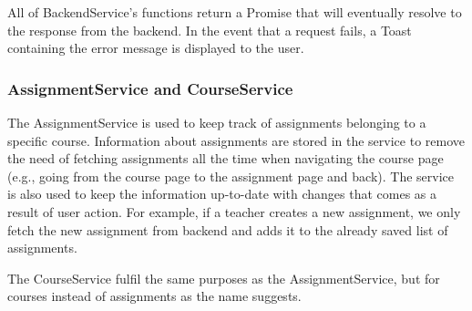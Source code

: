 All of BackendService's functions return a Promise that will eventually resolve to the response from the backend. In the event that a request fails, a Toast containing the error message is displayed to the user. 

\subsubsection{AssignmentService and CourseService}
The AssignmentService is used to keep track of assignments belonging to a specific course. Information about assignments are stored in the service to remove the need of fetching assignments all the time when navigating the course page (e.g., going from the course page to the assignment page and back). The service is also used to keep the information up-to-date with changes that comes as a result of user action. For example, if a teacher creates a new assignment, we only fetch the new assignment from backend and adds it to the already saved list of assignments.

The CourseService fulfil the same purposes as the AssignmentService, but for courses instead of assignments as the name suggests.
